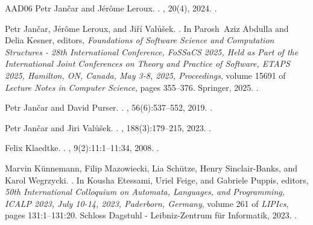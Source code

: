 \documentclass[11pt,a4paper]{amsart}
\theoremstyle{plain}
\theoremstyle{definition}
\theoremstyle{defC}
\theoremstyle{thmC}
\begin{document}
\begin{thebibliography}{AAD{\etalchar{+}}06}
Petr Jan\v{c}ar and J{\'{e}}r{\^{o}}me Leroux.
.
, 20(4), 2024.
\newblock \href {https://doi.org/10.46298/LMCS-20(4:23)2024}
  {}.

Petr Jan\v{c}ar, J{\'{e}}r{\^{o}}me Leroux, and Ji\v{r}{\'{i}} Val\r{u}\v{s}ek.
.
\newblock In Parosh~Aziz Abdulla and Delia Kesner, editors, {\em Foundations of
  Software Science and Computation Structures - 28th International Conference,
  FoSSaCS 2025, Held as Part of the International Joint Conferences on Theory
  and Practice of Software, {ETAPS} 2025, Hamilton, ON, Canada, May 3-8, 2025,
  Proceedings}, volume 15691 of {\em Lecture Notes in Computer Science}, pages
  355--376. Springer, 2025.
\newblock \href {https://doi.org/10.1007/978-3-031-90897-2\_17}
  {}.

Petr Jan\v{c}ar and David Purser.
.
, 56(6):537--552, 2019.
\newblock \href {https://doi.org/10.1007/s00236-019-00338-6}
  {}.

Petr Jan\v{c}ar and Jiri Val\r{u}\v{s}ek.
.
, 188(3):179--215, 2023.
\newblock \href {https://doi.org/10.3233/FI-222146}
  {}.

Felix Klaedtke.
.
, 9(2):11:1--11:34, 2008.
\newblock \href {https://doi.org/10.1145/1342991.1342995}
  {}.

Marvin K{\"{u}}nnemann, Filip Mazowiecki, Lia Sch{\"{u}}tze, Henry
  Sinclair{-}Banks, and Karol Wegrzycki.
.
\newblock In Kousha Etessami, Uriel Feige, and Gabriele Puppis, editors, {\em
  50th International Colloquium on Automata, Languages, and Programming,
  {ICALP} 2023, July 10-14, 2023, Paderborn, Germany}, volume 261 of {\em
  LIPIcs}, pages 131:1--131:20. Schloss Dagstuhl - Leibniz-Zentrum f{\"{u}}r
  Informatik, 2023.
\newblock \href {https://doi.org/10.4230/LIPICS.ICALP.2023.131}
  {}.


\end{thebibliography}
\end{document}
